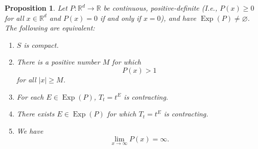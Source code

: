 \documentclass[11pt]{article}
\newtheorem{proposition}[theorem]{Proposition}
\newcommand\Exp{\operatorname{Exp}}
\begin{document}
\begin{proposition}\label{prop:PositiveHomogeneousCharacterization}
Let $P:\mathbb{R}^d\to\mathbb{R}$ be continuous, positive-definite (I.e., $P(x)\geq 0$ for all $x\in\mathbb{R}^d$ and $P(x)=0$ if and only if $x=0$), and have $\Exp(P)\neq \varnothing$. The following are equivalent:
\begin{enumerate}[label=(\alph*), ref=(\alph*)]
\item\label{cond:SisCompact} $S$ is compact.
\item\label{cond:PisAboveOne} There is a positive number $M$ for which
\begin{equation*}
P(x)>1
\end{equation*}
for all $|x|\geq M$. 
\item\label{cond:Contracting} For each $E\in\Exp(P)$, $T_t=t^E$ is contracting.
\item\label{cond:ThereExistsContracting} There exists $E\in\Exp(P)$ for which $T_t=t^E$ is contracting.
\item\label{cond:InfiniteLimit} We have
\begin{equation*}
\lim_{x\to\infty}P(x)=\infty.
\end{equation*}
\end{enumerate}
\end{proposition}
\end{document}
